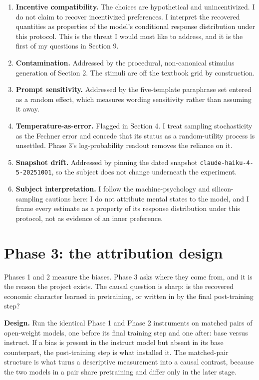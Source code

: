 \documentclass[11pt]{article}
\begin{document}
\begin{enumerate}[leftmargin=1.5em]
\item \textbf{Incentive compatibility.} The choices are hypothetical and unincentivized. I do not
claim to recover incentivized preferences. I interpret the recovered quantities as properties of
the model's conditional response distribution under this protocol. This is the threat I would most
like to address, and it is the first of my questions in Section 9.
\item \textbf{Contamination.} Addressed by the procedural, non-canonical stimulus generation of
Section 2. The stimuli are off the textbook grid by construction.
\item \textbf{Prompt sensitivity.} Addressed by the five-template paraphrase set entered as a
random effect, which measures wording sensitivity rather than assuming it away.
\item \textbf{Temperature-as-error.} Flagged in Section 4. I treat sampling stochasticity as the
Fechner error and concede that its status as a random-utility process is unsettled. Phase 3's
log-probability readout removes the reliance on it.
\item \textbf{Snapshot drift.} Addressed by pinning the dated snapshot
\texttt{claude-haiku-4-5-20251001}, so the subject does not change underneath the experiment.
\item \textbf{Subject interpretation.} I follow the machine-psychology and silicon-sampling
cautions here: I do not attribute mental states to the model, and I frame every estimate as a
property of its response distribution under this protocol, not as evidence of an inner preference.
\end{enumerate}

\section{Phase 3: the attribution design}

Phases 1 and 2 measure the biases. Phase 3 asks where they come from, and it is the reason the
project exists. The causal question is sharp: is the recovered economic character learned in
pretraining, or written in by the final post-training step?

\textbf{Design.} Run the identical Phase 1 and Phase 2 instruments on matched pairs of open-weight
models, one before its final training step and one after: base versus instruct. If a bias is
present in the instruct model but absent in its base counterpart, the post-training step is what
installed it. The matched-pair structure is what turns a descriptive measurement into a causal
contrast, because the two models in a pair share pretraining and differ only in the later stage.
\end{document}
